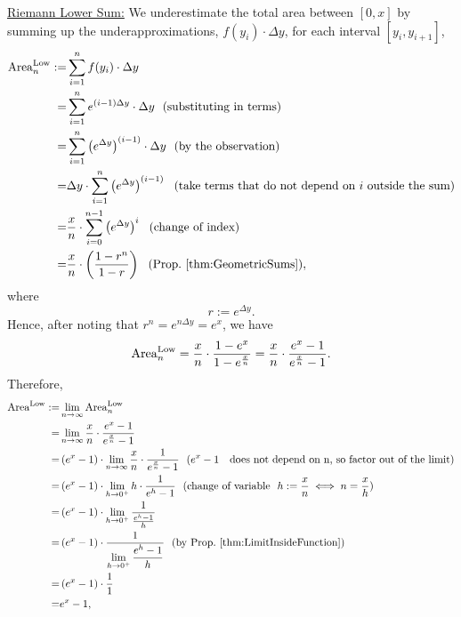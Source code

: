 \underline{Riemann Lower Sum:}
 We underestimate the total area between $[0, x]$ by summing up the underapproximations, $f(y_i)\cdot \Delta y$, for each interval $[y_i, y_{i+1}]$,
        \begin{equation}
        \begin{aligned}
            {\rm Area}^{\rm Low}_n : =& \sum_{i=1}^n f(y_i)\cdot \Delta y \\
            =& \sum_{i=1}^n e^{(i-1) \Delta y} \cdot \Delta y ~~(\text{substituting in terms})\\
            =&  \sum_{i=1}^n   \left( e^{\Delta y} \right)^{(i-1)}\cdot \Delta y ~~(\text{by the observation})\\
            =& \Delta y\cdot \sum_{i=1}^n   \left( e^{\Delta y} \right)^{(i-1)} ~~(\text{take terms that do not depend on $i$ outside the sum})\\
            =&  \frac{x}{n} \cdot \sum_{i=0}^{n-1}   \left( e^{\Delta y} \right)^{i} ~~(\text{change of index}) \\
            =& \frac{x}{n}\cdot \left( \frac{1 - r^{n}}{1-r}  \right) ~~({\rm Prop}.~\ref{thm:GeometricSums}), 
        \end{aligned}            
        \end{equation}
where
\begin{equation}
    r:=  e^{\Delta y}.
\end{equation}
Hence, after noting that $r^n = e^{n \Delta y} = e^x$, we have
\begin{equation}
  {\rm Area}^{\rm Low}_n  =  \frac{x}{n} \cdot \frac{1 -e^x}{1-e^{ \frac{x}{n}}} = \frac{x}{n} \cdot \frac{e^x - 1}{e^{ \frac{x}{n}} -1}.
\end{equation}
Therefore,
\begin{equation}
\begin{aligned}
  {\rm Area}^{\rm Low} :=& \lim_{n \to \infty} {\rm Area}^{\rm Low}_n  \\
  =&  \lim_{n \to \infty}\frac{x}{n} \cdot \frac{e^x - 1}{e^{ \frac{x}{n}} -1}  \\
  =& \left( e^x - 1 \right) \cdot \lim_{n \to \infty}\frac{x}{n} \cdot \frac{1}{e^{ \frac{x}{n}} -1}  ~~(e^x - 1 ~~~\text{does not depend on n, so factor out of the limit})\\
  =& \left( e^x - 1 \right) \cdot  \lim_{h \to 0^+} h \cdot \frac{1}{e^{ h} -1}  ~~(\text{change of variable}~~ h:= \frac{x}{n} \iff n = \frac{x}{h})\\
  =& \left( e^x - 1 \right) \cdot \lim_{h \to 0^+}  \frac{1}{ \frac{e^{ h} -1}{h}} \\
  =&\left( e^x - 1 \right) \cdot   \frac{1}{\displaystyle \lim_{h \to 0^+} \frac{e^{ h} -1}{h}}  ~~ (\text{by Prop.~\ref{thm:LimitInsideFunction}}) \\
  =& \left( e^x - 1 \right) \cdot \frac{1}{1} \\
  =& e^x-1,
\end{aligned} 
\end{equation}
